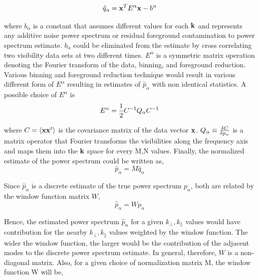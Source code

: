 \documentclass[twocolumn]{emulateapj}
\begin{document}
    \begin{equation}
    \hat q_{\alpha} = \bold x^{T} E^{\alpha} \bold x  - b^{\alpha}
    \label{eq15}
    \end{equation}
    
    where $b_{\alpha}$ is a constant that assumes different values for each $\bold k$ and represents any additive noise power spectrum or residual foreground contamination to power spectrum estimate. $b_{\alpha}$ could be eliminated from the estimate by cross correlating two visibility data sets at two different times. $E^{\alpha}$ is a symmetric matrix operation denoting the Fourier transform of the data, binning, and foreground reduction. Various binning and foreground reduction technique would result in various different form of $E^{\alpha}$ resulting in estimates of $\hat p_{\alpha}$ with non identical statistics. A possible choice of $E^{\alpha}$ is
    \begin{equation}
    E^{\alpha} =  {1 \over 2} C^{-1} Q_{\alpha} C^{-1}
    \label{eq16}
    \end{equation} 
    
    where $C = \langle \bold x \bold x^{t} \rangle$ is the covariance matrix of the data vector $\bold x$. $Q_{\alpha} \equiv {\delta C \over \delta p_{\alpha} } $ is a matrix operator that Fourier transforms the visibilities along the frequency axis and maps them into the $\bold k$ space for every M,N values. Finally, the normalized estimate of the power spectrum could be written as,  
    \begin{equation}
    \hat p_{\alpha} = M \hat q_{\alpha} 
    \label{eq17}
    \end{equation} 
    
    Since $\hat p_{\alpha}$ is a discrete estimate of the true power spectrum $p_{\alpha}$, both are related by the window function matrix $W$, 
    \begin{equation}
    \hat p_{\alpha} = W p_{\alpha}
    \label{eq18}
    \end{equation} 
    
    Hence, the estimated power spectrum $\hat p_{\alpha}$ for a given $k_{\perp}, k_{\parallel}$ values would have contribution for the nearby $k_{\perp}, k_{\parallel}$ values weighted by the window function. The wider the window function, the larger would be the contribution of the adjacent modes to the discrete power spectrum estimate. In general, therefore, $W$ is a non-diagonal matrix. Also, for a given choice of normalization matrix M, the window function W will be, 
    
\end{document}
